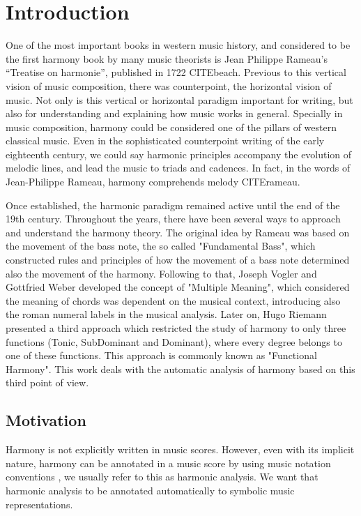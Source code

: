 \normallinespacing

\chapter{Introduction}
One of the most important books in western music history, and considered to be the first harmony book by many music theorists is Jean Philippe Rameau’s “Treatise on harmonie”, published in 1722 CITE{beach}. Previous to this vertical vision of music composition, there was counterpoint, the horizontal vision of music. Not only is this vertical or horizontal paradigm important for writing, but also for understanding and explaining how music works in general. Specially in music composition, harmony could be considered one of the pillars of western classical music. Even in the sophisticated counterpoint writing of the early eighteenth century, we could say harmonic principles accompany the evolution of melodic lines, and lead the music to triads and cadences. In fact, in the words of Jean-Philippe Rameau, harmony comprehends melody CITE{rameau}.

Once established, the harmonic paradigm remained active until the end of the 19th century. Throughout the years, there have been several ways to approach and understand the harmony theory. The original idea by Rameau was based on the movement of the bass note, the so called "Fundamental Bass", which constructed rules and principles of how the movement of a bass note determined also the movement of the harmony. Following to that, Joseph Vogler and Gottfried Weber developed the concept of "Multiple Meaning", which considered the meaning of chords was dependent on the musical context, introducing also the roman numeral labels in the musical analysis. Later on, Hugo Riemann presented a third approach which restricted the study of harmony to only three functions (Tonic, SubDominant and Dominant), where every degree belongs to one of these functions. This approach is commonly known as "Functional Harmony". This work deals with the automatic analysis of harmony based on this third point of view.

\section{Motivation}
Harmony is not explicitly written in music scores. However, even with its implicit nature, harmony can be annotated in a music score by using music notation conventions \cite{harte}, we usually refer to this as harmonic analysis. We want that harmonic analysis to be annotated automatically to symbolic music representations.

